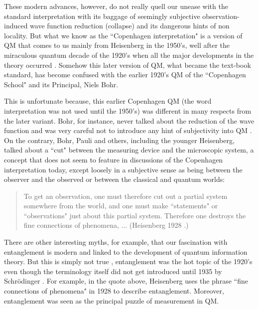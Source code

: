 \documentclass[12pt]{article}
\theoremstyle{plain}
\theoremstyle{definition}
\theoremstyle{remark}
\begin{document}
These modern advances, however, do not really quell our unease with the standard interpretation with its
baggage of seemingly subjective observation-induced wave function reduction (collapse) and its dangerous hints of non locality. 
But what we know as the  ``Copenhagen interpretation" is a version of QM that comes to us mainly from Heisenberg in the 1950's, well after the miraculous quantum decade of the 1920's when all the major developments in the theory occurred \cite{Howard1}. Somehow this later version of QM, what became the text-book standard, has become confused with the earlier 1920's QM of the ``Copenhagen School" and its Principal, Niels Bohr. 

This is unfortunate because, this earlier Copenhagen QM (the word interpretation was not used until the 1950's) was different in many respects from the later variant. Bohr, for instance, never talked about the reduction of the wave function and was very careful not to introduce any hint of subjectivity into QM \cite{Howard2}. On the contrary, Bohr, Pauli and others, including the younger Heisenberg, talked about a ``cut" between the measuring device and the microscopic system, a concept that does not seem to feature in discussions of the Copenhagen interpretation today, except loosely in a subjective sense as being between the observer and the observed or between the classical and quantum worlds:
\begin{quote}
To get an observation,  one must therefore cut out a partial system somewhere from the world, and one must make ``statements" or ``observations" just about this partial system. Therefore one destroys the fine connections of phenomena, ...  (Heisenberg 1928 \cite{BohrC}.)
\end{quote}

There are other interesting myths, for example, that our fascination with entanglement is modern and linked to the 
development of quantum information theory. But this is simply not true \cite{Howard3}, entanglement was the hot topic of the 1920's
even though the terminology itself did not get introduced until 1935 by Schr\"odinger \cite{Sch}. For example, in the quote above, Heisenberg uses the phrase ``fine connections of phenomena" in 1928 to describe entanglement. Moreover, entanglement was seen as the principal puzzle of measurement in QM.
\end{document}
